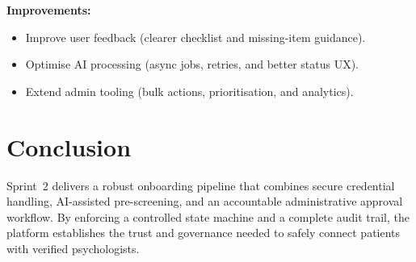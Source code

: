 \textbf{Improvements:}
\begin{itemize}
    \item Improve user feedback (clearer checklist and missing-item guidance).
    \item Optimise AI processing (async jobs, retries, and better status UX).
    \item Extend admin tooling (bulk actions, prioritisation, and analytics).
\end{itemize}

\section{Conclusion}
\label{sec:sprint2-conclusion}

Sprint~2 delivers a robust onboarding pipeline that combines secure credential
handling, AI-assisted pre-screening, and an accountable administrative approval
workflow. By enforcing a controlled state machine and a complete audit trail,
the platform establishes the trust and governance needed to safely connect
patients with verified psychologists.

